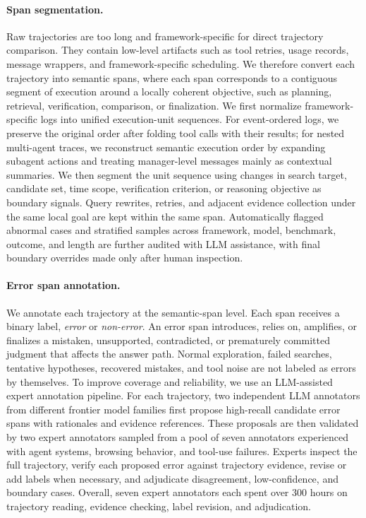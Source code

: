\paragraph{Span segmentation.}
Raw trajectories are too long and framework-specific for direct trajectory comparison. They contain low-level artifacts such as tool retries, usage records, message wrappers, and framework-specific scheduling. We therefore convert each trajectory into semantic spans, where each span corresponds to a contiguous segment of execution around a locally coherent objective, such as planning, retrieval, verification, comparison, or finalization. We first normalize framework-specific logs into unified execution-unit sequences. For event-ordered logs, we preserve the original order after folding tool calls with their results; for nested multi-agent traces, we reconstruct semantic execution order by expanding subagent actions and treating manager-level messages mainly as contextual summaries. We then segment the unit sequence using changes in search target, candidate set, time scope, verification criterion, or reasoning objective as boundary signals. Query rewrites, retries, and adjacent evidence collection under the same local goal are kept within the same span. Automatically flagged abnormal cases and stratified samples across framework, model, benchmark, outcome, and length are further audited with LLM assistance, with final boundary overrides made only after human inspection.

\paragraph{Error span annotation.}
We annotate each trajectory at the semantic-span level. Each span receives a binary label, \emph{error} or \emph{non-error}. An error span introduces, relies on, amplifies, or finalizes a mistaken, unsupported, contradicted, or prematurely committed judgment that affects the answer path. Normal exploration, failed searches, tentative hypotheses, recovered mistakes, and tool noise are not labeled as errors by themselves. To improve coverage and reliability, we use an LLM-assisted expert annotation pipeline. For each trajectory, two independent LLM annotators from different frontier model families first propose high-recall candidate error spans with rationales and evidence references. These proposals are then validated by two expert annotators sampled from a pool of seven annotators experienced with agent systems, browsing behavior, and tool-use failures. Experts inspect the full trajectory, verify each proposed error against trajectory evidence, revise or add labels when necessary, and adjudicate disagreement, low-confidence, and boundary cases. Overall, seven expert annotators each spent over 300 hours on trajectory reading, evidence checking, label revision, and adjudication.
